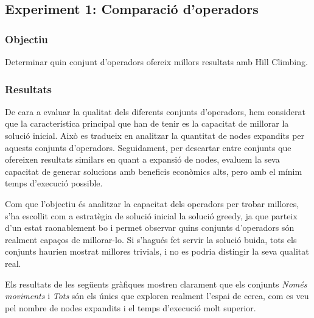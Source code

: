 \subsection{Experiment 1: Comparació d'operadors}

\vspace{0.75cm}

\subsubsection{Objectiu}
Determinar quin conjunt d'operadors ofereix millors resultats amb Hill Climbing.

\subsubsection{Resultats}

De cara a evaluar la qualitat dels diferents conjunts d'operadors, hem considerat que la característica principal que han de tenir es la capacitat de millorar la solució inicial. Això es tradueix en analitzar la quantitat de nodes expandits per aquests conjunts d'operadors. Seguidament, per descartar entre conjunts que ofereixen resultats similars en quant a expansió de nodes, evaluem la seva capacitat de generar solucions amb beneficis econòmics alts, pero amb el mínim temps d'execució possible.

\vspace{0.2cm}

Com que l’objectiu és analitzar la capacitat dels operadors per trobar millores, s’ha escollit com a estratègia de solució inicial la solució greedy, ja que parteix d’un estat raonablement bo i permet observar quins conjunts d'operadors són realment capaços de millorar-lo. Si s’hagués fet servir la solució buida, tots els conjunts haurien mostrat millores trivials, i no es podria distingir la seva qualitat real.

\vspace{0.2cm}

Els resultats de les següents gràfiques mostren clarament que els conjunts \textit{Només moviments} i \textit{Tots} són els únics que exploren realment l’espai de cerca, com es veu pel nombre de nodes expandits i el temps d’execució molt superior. 

\vspace{0.5cm}



\vspace{0.5cm}

